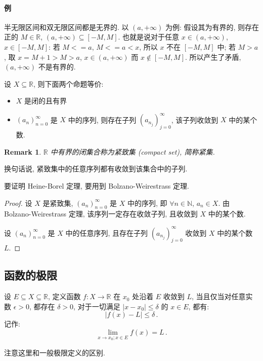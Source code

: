 \documentclass[UTF8]{ctexart}
\theoremstyle{mystyle}
\theoremstyle{myremark}
\newtheorem*{remark}{Remark}
\theoremstyle{plain}
\newcommand{\R}{\mathbb R}
\newcommand{\N}{\mathbb N}
\begin{document}
\paragraph{例}
半无限区间和双无限区间都是无界的. 以 $ (a, +\infty) $ 为例: 假设其为有界的, 则存在正的 $ M \in \R $, $ (a, +\infty) \subseteq [-M, M] $. 也就是说对于任意 $ x \in (a, +\infty) $, $ x \in [-M, M] $: 若 $ M <= a $, $ M <= a < x $, 所以 $ x $ 不在 $ [-M, M] $ 中; 若 $ M > a $, 取 $ x = M + 1 > M > a $, $ x \in (a, +\infty) $ 而  $ x \notin [-M, M] $. 所以产生了矛盾, $ (a, +\infty) $ 不是有界的.

\begin{theorem}
    设 $ X \subseteq \R $, 则下面两个命题等价:
    \begin{itemize}
        \item $ X $ 是闭的且有界
        \item $ (a_n)_{n = 0}^\infty $ 是 $ X $ 中的序列, 则存在子列 $ (a_{n_j})_{j = 0}^\infty $, 该子列收敛到 $ X $ 中的某个数.
    \end{itemize}
\end{theorem}

\begin{remark}
    $ \R $ 中有界的闭集合称为紧致集 (compact set), 简称紧集.
\end{remark}

换句话说, 紧致集中的任意序列都有收敛到该集合中的子列.

要证明 Heine-Borel 定理, 要用到 Bolzano-Weirestrass 定理.

\begin{proof}
    设 $ X $ 是紧致集, $ (a_n)_{n = 0}^\infty $ 是 $ X $ 中的序列, 即 $ \forall n \in \N $, $ a_n \in X $. 由 Bolzano-Weirestrass 定理, 该序列一定存在收敛子列, 且收敛到 $ X $ 中的某个数.

    设 $ (a_n)_{n = 0}^\infty $ 是 $ X $ 中的任意序列, 且存在子列 $ (a_{n_j})_{j = 0}^\infty $ 收敛到 $ X $ 中的某个数 $ L $.
\end{proof}

\subsection{函数的极限}
\begin{definition}
    设 $ E \subseteq X \subseteq \R $, 定义函数 $ f \colon X \to \R $ 在 $ x_0 $ 处沿着 $ E $ 收敛到 $ L $, 当且仅当对任意实数 $ \epsilon > 0 $, 都存在 $ \delta > 0 $, 对于一切满足 $ |x - x_0| \leqslant \delta $ 的 $ x \in E $, 都有: \[ |f(x) - L| \leqslant \delta \,.\] 记作: \[ \lim_{x \to x_0; x \in E} f(x) = L \,.\]
\end{definition}

注意这里和一般极限定义的区别. $  $
\end{document}
